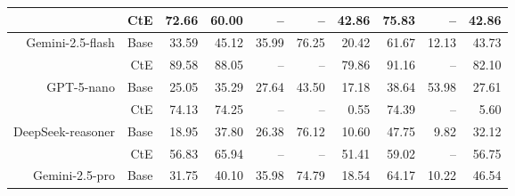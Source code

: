 \begin{table}[!t]
\begin{tabular}{r r !{\color{white!80!black} \vline} r r r r r !{\color{white!80!black} \vline} r r r}
 & CtE & \textcolor{blue!60!black}{72.66} & \textcolor{blue!60!black}{60.00} & \textcolor{blue!60!black}{--} & \textcolor{blue!60!black}{--} & \textcolor{blue!60!black}{42.86} & \textcolor{blue!60!black}{75.83} & \textcolor{blue!60!black}{--} & \textcolor{blue!60!black}{42.86} \\ \midrule
 \sf Gemini-2.5-flash & Base & \textcolor{blue!60!black}{33.59} & \textcolor{blue!60!black}{45.12} & \textcolor{blue!60!black}{35.99} & \textcolor{blue!60!black}{76.25} & \textcolor{blue!60!black}{20.42} & \textcolor{blue!60!black}{61.67} & \textcolor{blue!60!black}{12.13} & \textcolor{blue!60!black}{43.73} \\
 & CtE & \textcolor{blue!60!black}{89.58} & \textcolor{blue!60!black}{88.05} & \textcolor{blue!60!black}{--} & \textcolor{blue!60!black}{--} & \textcolor{blue!60!black}{79.86} & \textcolor{blue!60!black}{91.16} & \textcolor{blue!60!black}{--} & \textcolor{blue!60!black}{82.10} \\ \midrule
 \sf GPT-5-nano & Base & \textcolor{blue!60!black}{25.05} & \textcolor{blue!60!black}{35.29} & \textcolor{blue!60!black}{27.64} & \textcolor{blue!60!black}{43.50} & \textcolor{blue!60!black}{17.18} & \textcolor{blue!60!black}{38.64} & \textcolor{blue!60!black}{53.98} & \textcolor{blue!60!black}{27.61} \\
 & CtE & \textcolor{blue!60!black}{74.13} & \textcolor{blue!60!black}{74.25} & \textcolor{blue!60!black}{--} & \textcolor{blue!60!black}{--} & \textcolor{blue!60!black}{0.55} & \textcolor{blue!60!black}{74.39} & \textcolor{blue!60!black}{--} & \textcolor{blue!60!black}{5.60} \\ \midrule
 \sf DeepSeek-reasoner & Base & \textcolor{blue!60!black}{18.95} & \textcolor{blue!60!black}{37.80} & \textcolor{blue!60!black}{26.38} & \textcolor{blue!60!black}{76.12} & \textcolor{blue!60!black}{10.60} & \textcolor{blue!60!black}{47.75} & \textcolor{blue!60!black}{9.82} & \textcolor{blue!60!black}{32.12} \\
 & CtE & \textcolor{blue!60!black}{56.83} & \textcolor{blue!60!black}{65.94} & \textcolor{blue!60!black}{--} & \textcolor{blue!60!black}{--} & \textcolor{blue!60!black}{51.41} & \textcolor{blue!60!black}{59.02} & \textcolor{blue!60!black}{--} & \textcolor{blue!60!black}{56.75} \\ \midrule
 \sf Gemini-2.5-pro & Base & \textcolor{blue!60!black}{31.75} & \textcolor{blue!60!black}{40.10} & \textcolor{blue!60!black}{35.98} & \textcolor{blue!60!black}{74.79} & \textcolor{blue!60!black}{18.54} & \textcolor{blue!60!black}{64.17} & \textcolor{blue!60!black}{10.22} & \textcolor{blue!60!black}{46.54} \\

\end{tabular}
\end{table}
